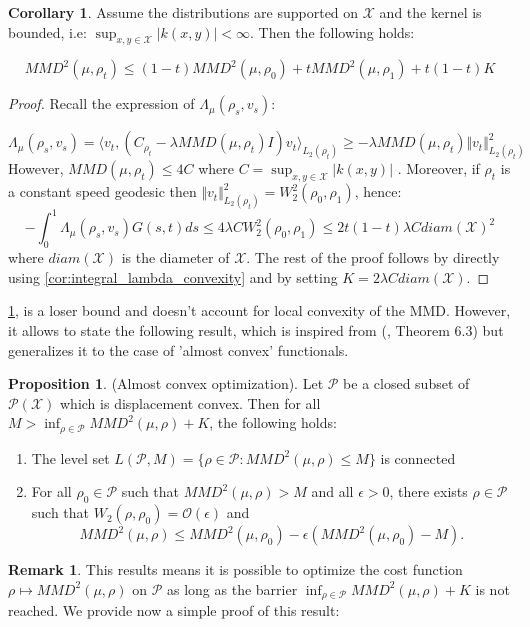 \documentclass{article}
\newcommand{\1}{\mathbbm 1}
\theoremstyle{definition}
\newtheorem{corollary}[theorem]{Corollary}
\newtheorem{proposition}[theorem]{Proposition}
\newtheorem{remark}{Remark}
\begin{document}
%
\begin{corollary}
\label{cor:loser_bound}Assume the distributions are supported on
$\mathcal{X}$ and the kernel is bounded, i.e: $\sup_{x,y\in\mathcal{X}}\vert k(x,y)\vert<\infty$.
Then the following holds:

\[
MMD^{2}(\mu,\rho_{t})\leq(1-t)MMD^{2}(\mu,\rho_{0})+tMMD^{2}(\mu,\rho_{1})+t(1-t)K
\]
\end{corollary}
%
\begin{proof}
Recall the expression of $\Lambda_{\mu}(\rho_{s},v_{s}):$

\[
\Lambda_{\mu}(\rho_{s},v_{s})=\langle v_{t},(C_{\rho_{t}}-\lambda MMD(\mu,\rho_{t})I)v_{t}\rangle_{L_{2}(\rho_{t})}\geq-\lambda MMD(\mu,\rho_{t})\Vert v_{t}\Vert_{L_{2}(\rho_{t})}^{2}
\]
However, $MMD(\mu,\rho_{t})\leq4C$ where $C=\sup_{x,y\in\mathcal{X}}\vert k(x,y)\vert$
. Moreover, if $\rho_{t}$ is a constant speed geodesic then $\Vert v_{t}\Vert_{L_{2}(\rho_{t})}^{2}=W_{2}^{2}(\rho_{0},\rho_{1})$,
hence: 
\[
-\int_{0}^{1}\Lambda_{\mu}(\rho_{s},v_{s})G(s,t)ds\leq4\lambda CW_{2}^{2}(\rho_{0},\rho_{1})\leq2t(1-t)\lambda Cdiam(\mathcal{X})^{2}
\]
where $diam(\mathcal{X})$ is the diameter of $\mathcal{X}$. The
rest of the proof follows by directly using \ref{cor:integral_lambda_convexity}
and by setting $K=2\lambda Cdiam(\mathcal{X})$.
\end{proof}
%
\ref{cor:loser_bound}, is a loser bound and doesn't account for local
convexity of the MMD. However, it allows to state the following result,
which is inspired from (\cite{Bottou:2017}, Theorem 6.3) but generalizes
it to the case of 'almost convex' functionals.
\begin{proposition}

(Almost convex optimization). Let $\mathcal{P}$ be a closed subset
of $\mathcal{P}(\mathcal{X})$ which is displacement convex. Then
for all $M>\inf_{\rho\in\mathcal{P}}MMD^{2}(\mu,\rho)+K$, the following
holds:
\end{proposition}
\begin{enumerate}
\item The level set $L(\mathcal{P},M)=\{\rho\in\mathcal{P}:MMD^{2}(\mu,\rho)\leq M\}$
is connected
\item For all $\rho_{0}\in\mathcal{P}$ such that $MMD^{2}(\mu,\rho)>M$
and all $\epsilon>0$, there exists $\rho\in\mathcal{P}$ such that
$W_{2}(\rho,\rho_{0})=\mathcal{O}(\epsilon)$ and
\[
MMD^{2}(\mu,\rho)\leq MMD^{2}(\mu,\rho_{0})-\epsilon(MMD^{2}(\mu,\rho_{0})-M).
\]
\end{enumerate}
%
\begin{remark}
This results means it is possible to optimize the cost function $\rho\mapsto MMD^{2}(\mu,\rho)$
on $\mathcal{P}$ as long as the barrier $\inf_{\rho\in\mathcal{P}}MMD^{2}(\mu,\rho)+K$
is not reached. We provide now a simple proof of this result:
\end{remark}
\end{document}
